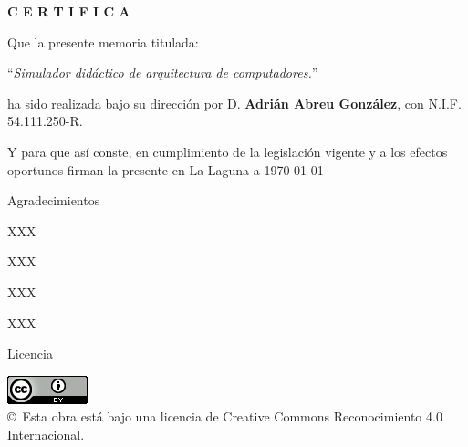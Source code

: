 \documentclass[spanish,a4paper,14pt,oneside]{extreport}
\begin{document}
\bigskip
\bigskip
{\bf C E R T I F I C A}

\bigskip
\bigskip
\bigskip
Que la presente memoria titulada:

\bigskip
``{\it Simulador didáctico de arquitectura de computadores.}''

\bigskip
\bigskip
\bigskip

\noindent ha sido realizada bajo su dirección por D. {\bf Adrián Abreu González},
con N.I.F. 54.111.250-R.

\bigskip
\bigskip

Y para que así conste, en cumplimiento de la legislación vigente y a los efectos
oportunos firman la presente en La Laguna a \today

\newpage
\thispagestyle{empty}

{ \flushright

\begin{LARGE}
Agradecimientos
\end{LARGE}

\hspace{3mm}

\begin{large}


\hspace{3mm}
XXX

\hspace{3mm}
XXX


\hspace{3mm}
XXX


\hspace{3mm}
XXX


\end{large}

}

\newpage

\begin{huge}
Licencia
\end{huge}

\bigskip
\begin{center}
\includegraphics[scale=1.5]{images/by_88x31}\\[10mm]
{\Large \copyright~Esta obra está bajo una licencia de Creative Commons Reconocimiento 4.0 Internacional.
}
\end{center}
\end{document}
